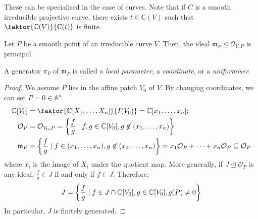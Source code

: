These can be specialised in the case of curves.
Note that if \( C \) is a smooth irreducible projective curve, there exists \( t \in \mathbb C(V) \) such that \( \faktor{\mathbb C(V)}{\mathbb C(t)} \) is finite.
\begin{theorem}
    Let \( P \) be a smooth point of an irreducible curve \( V \).
    Then, the ideal \( \mathfrak m_P \trianglelefteq \mathcal O_{V,P} \) is principal.
\end{theorem}
A generator \( \pi_P \) of \( \mathfrak m_P \) is called a \emph{local parameter}, a \emph{coordinate}, or a \emph{uniformiser}.
\begin{proof}
    We assume \( P \) lies in the affine patch \( V_0 \) of \( V \).
    By changing coordinates, we can set \( P = 0 \in \mathbb A^n \).
    \begin{align*}
        \mathbb C[V_0] &= \faktor{\mathbb C[X_1, \dots, X_n]}{I(V_0)} = \mathbb C[x_1, \dots, x_n];\\
        \mathcal O_P &= \mathcal O_{V_0,P} = \qty{\frac{f}{g} \mid f, g \in \mathbb C[V_0], g \not\in (x_1, \dots, x_n)}\\
        \mathfrak m_P &= \qty{\frac{f}{g} \mid f \in (x_1, \dots, x_n), g \not\in (x_1, \dots, x_n)} = x_1 \mathcal O_P + \dots + x_n \mathcal O_P \subseteq \mathcal O_P
    \end{align*}
    where \( x_i \) is the image of \( X_i \) under the quotient map.
    More generally, if \( J \trianglelefteq \mathcal O_P \) is any ideal, \( \frac{f}{g} \in J \) if and only if \( f \in J \).
    Therefore,
    \[ J = \qty{\frac{f}{g} \mid f \in J \cap \mathbb C[V_0], g \in \mathbb C[V_0], g(P) \neq 0} \]
    In particular, \( J \) is finitely generated.
    

\end{proof}
